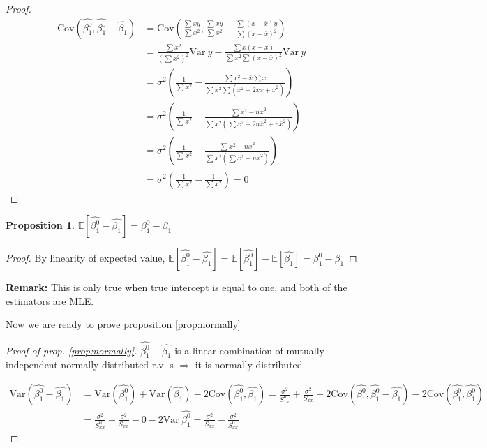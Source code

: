 \documentclass[12pt,a4paper,oneside]{book} %
\newtheorem{proposition}[theorem]{Proposition}
\newcommand{\E}{\mathbb{E}}
\newcommand{\Var}{\mathrm{Var}}
\newcommand{\Cov}{\mathrm{Cov}}
\begin{document}
\begin{proof}
	\begin{align*}
		\Cov (\hat{\beta_1^0},\hat{\beta_1^0}-\hat{\beta_1}) &=
		\Cov (\frac{\sum xy}{\sum x^2},\frac{\sum xy}{\sum x^2}-\frac{\sum (x-\bar{x})y}{\sum (x-\bar{x})^2})  \\
		&= \frac{\sum x^2}{(\sum x^2)^2} \Var\  y - \frac{\sum x(x-\bar{x})}{\sum x^2 \sum (x-\bar{x})^2} \Var \ y \\
		&=\sigma^2(\frac{1}{\sum x^2} - \frac{\sum x^2 - \bar{x}\sum x}{\sum x^2 \sum(x^2-2x\bar{x}+\bar{x}^2)}) \\
		&= \sigma^2 (\frac{1}{\sum x^2}-\frac{\sum x^2 - n \bar{x}^2}{\sum x^2(\sum x^2 - 2n\bar{x}^2+n\bar{x}^2)}) \\
		&=\sigma^2 (\frac{1}{\sum x^2}-\frac{\sum x^2 - n \bar{x}^2}{\sum x^2(\sum x^2 -n\bar{x}^2)}) \\
		&= \sigma^2(\frac{1}{\sum x^2}-\frac{1}{\sum x^2})=0
	\end{align*}
\end{proof}

\begin{proposition}
	$\E [\hat{\beta_1^0}-\hat{\beta_1}]=\beta_1^0-\beta_1$ 
\end{proposition}

\begin{proof}
	By linearity of expected value, $\E [\hat{\beta_1^0}-\hat{\beta_1}]= \E[\hat{\beta_1^0}] - \E[\hat{\beta_1}]= \beta_1^0-\beta_1 $
\end{proof}

\textbf{Remark:} This is only true when true intercept is equal to one, and both of the estimators are MLE.
	
	Now we are ready to prove proposition \ref{prop:normally}
\begin{proof}[Proof of prop. \ref{prop:normally}]
	$\hat{\beta_1^0}-\hat{\beta_1}$ is a linear combination of mutually independent normally distributed r.v.-s $\Rightarrow$ it is normally distributed.
	
	
	\begin{align*}
		\Var (\hat{\beta_1^0}-\hat{\beta_1})&=\Var(\hat{\beta_1^0}) + \Var(\hat{\beta_1}) - 2 \Cov (\hat{\beta_1^0},\hat{\beta_1}) =\frac{\sigma^2}{S_{xx}^0}+\frac{\sigma^2}{S_{xx}}-2 \Cov (\hat{\beta_1^0},\hat{\beta_1^0}-\hat{\beta_1})-2 \Cov (\hat{\beta_1^0},\hat{\beta_1^0}) \\
		&= \frac{\sigma^2}{S_{xx}^0}+\frac{\sigma^2}{S_{xx}} - 0 -2 \Var \ \hat{\beta_1^0}=\frac{\sigma^2}{S_{xx}}-\frac{\sigma^2}{S_{xx}^0}
	\end{align*}
\end{proof}
	
\end{document}

